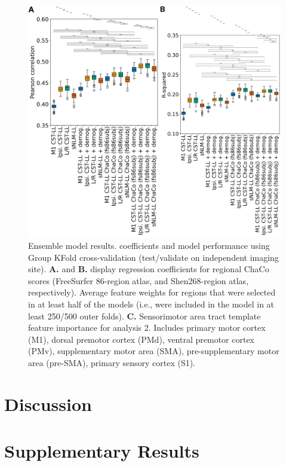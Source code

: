 \documentclass[10pt]{article}
\begin{document}
\begin{figure}[htp]
\centering
\includegraphics[width=1\linewidth]{figures/Analysis2.png}
\caption{Ensemble model results. coefficients and model performance using Group KFold cross-validation (test/validate on independent imaging site). \textbf{A.} and \textbf{B.} display regression coefficients for regional ChaCo scores (FreeSurfer 86-region atlas, and Shen268-region atlas, respectively). Average feature weights for regions that were selected in at least half of the models (i.e., were included in the model in at least 250/500 outer folds). \textbf{C.} Sensorimotor area tract template feature importance for analysis 2. Includes primary motor cortex (M1), dorsal premotor cortex (PMd), ventral premotor cortex (PMv), supplementary motor area (SMA), pre-supplementary motor area (pre-SMA), primary sensory cortex (S1).}
\label{nemotool}
\end{figure}



\section{Discussion}

\clearpage



\printbibliography
\section*{Supplementary Results}
\end{document}
